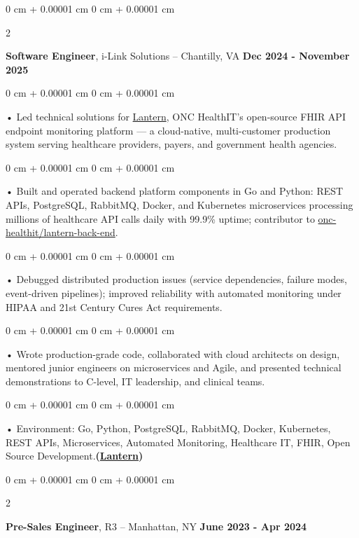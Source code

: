\documentclass[10pt, letterpaper]{article}
\newenvironment{onecolentry}{
    \begin{adjustwidth}{
        0 cm + 0.00001 cm
    }{
        0 cm + 0.00001 cm
    }
}{
    \end{adjustwidth}
} %
\newenvironment{twocolentry}[2][]{
    \onecolentry
    \def\secondColumn{#2}
    \setcolumnwidth{\fill, 4.5 cm}
    \begin{paracol}{2}
}{
    \switchcolumn \raggedleft \secondColumn
    \end{paracol}
    \endonecolentry
} %
\begin{document}
        \vspace{0.1cm}

        \begin{twocolentry}{
            \textbf{Dec 2024 - November 2025}
        }
            \textbf{Software Engineer}, i-Link Solutions -- Chantilly, VA\end{twocolentry}


        \begin{onecolentry}
             • Led technical solutions for \href{https://lantern.healthit.gov/?tab=dashboard_tab}{Lantern}, ONC HealthIT's open-source FHIR API endpoint monitoring platform --- a cloud-native, multi-customer production system serving healthcare providers, payers, and government health agencies.
        \end{onecolentry}
        \begin{onecolentry}
             • Built and operated backend platform components in Go and Python: REST APIs, PostgreSQL, RabbitMQ, Docker, and Kubernetes microservices processing millions of healthcare API calls daily with 99.9\% uptime; contributor to \href{https://github.com/onc-healthit/lantern-back-end}{onc-healthit/lantern-back-end}.
        \end{onecolentry}
        \begin{onecolentry}
             • Debugged distributed production issues (service dependencies, failure modes, event-driven pipelines); improved reliability with automated monitoring under HIPAA and 21st Century Cures Act requirements.
        \end{onecolentry}
        \begin{onecolentry}
             • Wrote production-grade code, collaborated with cloud architects on design, mentored junior engineers on microservices and Agile, and presented technical demonstrations to C-level, IT leadership, and clinical teams.
        \end{onecolentry}
        \begin{onecolentry}
             • Environment: Go, Python, PostgreSQL, RabbitMQ, Docker, Kubernetes, REST APIs, Microservices, Automated Monitoring, Healthcare IT, FHIR, Open Source Development.\textbf{(\href{https://lantern.healthit.gov/?tab=dashboard_tab}{Lantern})}
        \end{onecolentry}
        \vspace{0.1cm}

        \begin{twocolentry}{
            \textbf{June 2023 - Apr 2024}
        }
            \textbf{Pre-Sales Engineer}, R3 -- Manhattan, NY\end{twocolentry}
\end{document}
